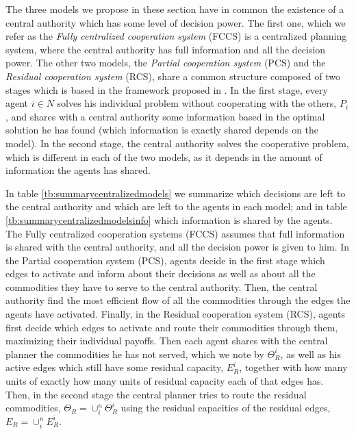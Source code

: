 \documentclass{article}
\begin{document}
The three models we propose in these section have in common the existence of a central authority which has some level of decision power. The first one, which we refer as the \emph{Fully centralized cooperation system} (FCCS) is a centralized planning system, where the central authority has full information and all the decision power. The other two models, the \emph{Partial cooperation system} (PCS) and the \emph{Residual cooperation system} (RCS), share a common structure composed of two stages which is based in the framework proposed in \textcite{ANUPINDI2001}. In the first stage, every agent $i\in N$ solves his individual problem without cooperating with the others, $P_i$, and shares with a central authority some information based in the optimal solution he has found (which information is exactly shared depends on the model). In the second stage, the central authority solves the cooperative problem, which is different in each of the two models, as it depends in the amount of information the agents has shared.

In table \ref{tb:summarycentralizedmodels} we summarize which decisions are left to the central authority and which are left to the agents in each model; and in table \ref{tb:summarycentralizedmodelsinfo} which information is shared by the agents. The Fully centralized cooperation systems (FCCS) assumes that full information is shared with the central authority, and all the decision power is given to him. In the Partial cooperation system (PCS), agents decide in the first stage which edges to activate and inform about their decisions as well as about all the commodities they have to serve to the central authority. Then, the central authority find the most efficient flow of all the commodities through the edges the agents have activated. Finally, in the Residual cooperation system (RCS), agents first decide which edges to activate and route their commodities through them, maximizing their individual payoffs. Then each agent shares with the central planner the commodities he has not served, which we note by $\Theta_R^i$, as well as his active edges which still have some residual capacity, $E_R^i$, together with how many units of exactly how many units of residual capacity each of that edges has. Then, in the second stage the central planner tries to route the residual commodities, $\Theta_R = \cup_i^n \Theta_R^i$ using the residual capacities of the residual edges, $E_R = \cup_i^n E_R^i$.
\end{document}
